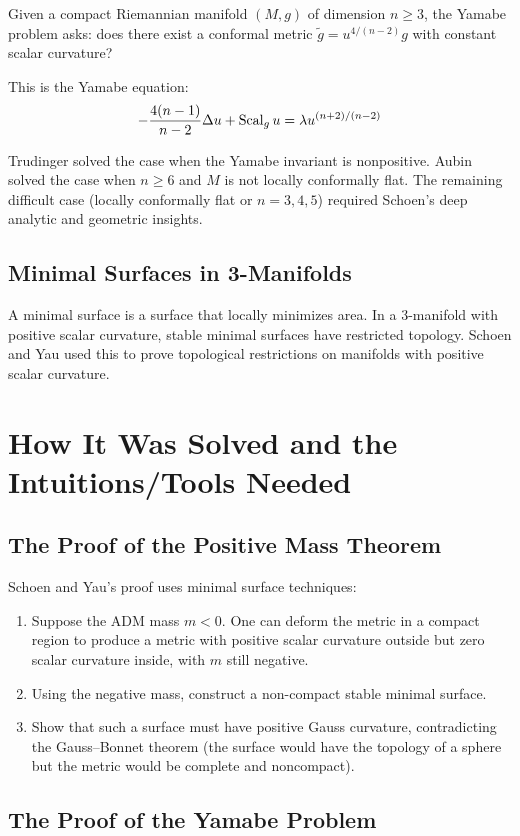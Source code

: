 Given a compact Riemannian manifold $(M, g)$ of dimension $n \geq 3$, the Yamabe problem asks: does there exist a conformal metric $\tilde g = u^{4/(n-2)} g$ with constant scalar curvature?

This is the Yamabe equation:
\[
-\frac{4(n-1)}{n-2} \Delta u + \operatorname{Scal}_g u = \lambda u^{(n+2)/(n-2)}
\]

Trudinger solved the case when the Yamabe invariant is nonpositive. Aubin solved the case when $n \geq 6$ and $M$ is not locally conformally flat. The remaining difficult case (locally conformally flat or $n = 3,4,5$) required Schoen's deep analytic and geometric insights.

\subsection{Minimal Surfaces in 3-Manifolds}

A minimal surface is a surface that locally minimizes area. In a 3-manifold with positive scalar curvature, stable minimal surfaces have restricted topology. Schoen and Yau used this to prove topological restrictions on manifolds with positive scalar curvature.

\section{How It Was Solved and the Intuitions/Tools Needed}

\subsection{The Proof of the Positive Mass Theorem}

Schoen and Yau's proof uses minimal surface techniques:
\begin{enumerate}
    \item Suppose the ADM mass $m < 0$. One can deform the metric in a compact region to produce a metric with positive scalar curvature outside but zero scalar curvature inside, with $m$ still negative.
    \item Using the negative mass, construct a non-compact stable minimal surface.
    \item Show that such a surface must have positive Gauss curvature, contradicting the Gauss--Bonnet theorem (the surface would have the topology of a sphere but the metric would be complete and noncompact).
\end{enumerate}

\subsection{The Proof of the Yamabe Problem}

